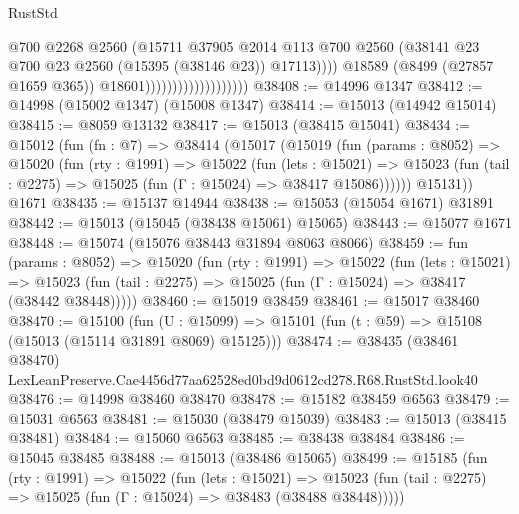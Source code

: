 \begin{lexlean}{RustStd}
\begin{coremodule}
                                              @700
                                              @2268
                                              @2560
                                              (@15711
                                                @37905
                                                @2014
                                                @113
                                                @700
                                                @2560
                                                (@38141
                                                  @23
                                                  @700
                                                  @23
                                                  @2560
                                                  (@15395 (@38146 @23))
                                                  @17113))))
                                          @18589
                                          (@8499 (@27857 @1659 @365))
                                          @18601)))))))))))))))))))
@38408 := @14996 @1347
@38412 := @14998 (@15002 @1347) (@15008 @1347)
@38414 := @15013 (@14942 @15014)
@38415 := @8059 @13132
@38417 := @15013 (@38415 @15041)
@38434 := @15012
    (fun (fn : @7) =>
    @38414
      (@15017
        (@15019
          (fun (params : @8052) =>
          @15020
            (fun (rty : @1991) =>
            @15022
              (fun (lets : @15021) =>
              @15023 (fun (tail : @2275) => @15025 (fun (Γ : @15024) => @38417 @15086))))))
        @15131))
    @1671
@38435 := @15137 @14944
@38438 := @15053 (@15054 @1671) @31891
@38442 := @15013 (@15045 (@38438 @15061) @15065)
@38443 := @15077 @1671
@38448 := @15074 (@15076 @38443 @31894 @8063 @8066)
@38459 := fun (params : @8052) =>
  @15020
    (fun (rty : @1991) =>
    @15022
      (fun (lets : @15021) =>
      @15023 (fun (tail : @2275) => @15025 (fun (Γ : @15024) => @38417 (@38442 @38448)))))
@38460 := @15019 @38459
@38461 := @15017 @38460
@38470 := @15100
    (fun (U : @15099) => @15101 (fun (t : @59) => @15108 (@15013 (@15114 @31891 @8069) @15125)))
@38474 := @38435
    (@38461 @38470)
    LexLeanPreserve.Cae4456d77aa62528ed0bd9d0612cd278.R68.RustStd.look40
@38476 := @14998 @38460 @38470
@38478 := @15182 @38459 @6563
@38479 := @15031 @6563
@38481 := @15030 (@38479 @15039)
@38483 := @15013 (@38415 @38481)
@38484 := @15060 @6563
@38485 := @38438 @38484
@38486 := @15045 @38485
@38488 := @15013 (@38486 @15065)
@38499 := @15185
    (fun (rty : @1991) =>
    @15022
      (fun (lets : @15021) =>
      @15023 (fun (tail : @2275) => @15025 (fun (Γ : @15024) => @38483 (@38488 @38448)))))

\end{coremodule}
\end{lexlean}

